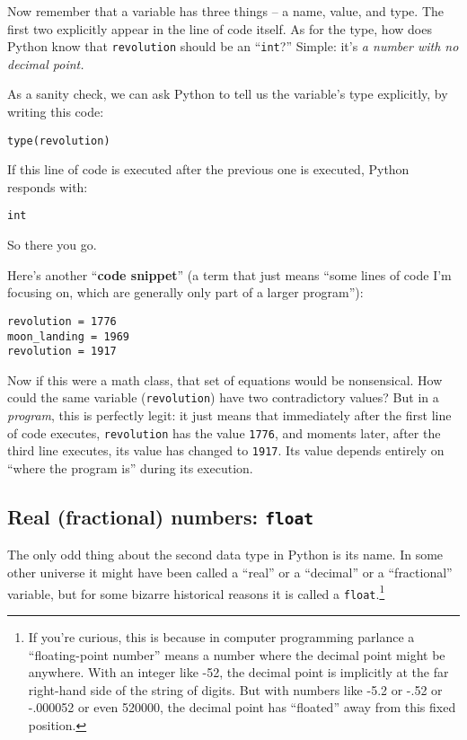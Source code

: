 Now remember that a variable has three things -- a name, value, and type. The
first two explicitly appear in the line of code itself. As for the type, how
does Python know that \texttt{revolution} should be an ``\texttt{int}?''
Simple: it's \textit{a number with no decimal point.}

As a sanity check, we can ask Python to tell us the variable's type explicitly,
by writing this code:

\begin{Verbatim}[fontsize=\small,samepage=true,frame=single,framesep=3mm]
type(revolution)
\end{Verbatim}

If this line of code is executed after the previous one is executed, Python
responds with:

\begin{Verbatim}[fontsize=\small,samepage=true,frame=leftline,framesep=5mm,framerule=1mm]
int
\end{Verbatim}

So there you go.

Here's another ``\textbf{code snippet}'' (a term that just means ``some lines
of code I'm focusing on, which are generally only part of a larger program''):

\begin{Verbatim}[fontsize=\small,samepage=true,frame=single,framesep=3mm]
revolution = 1776
moon_landing = 1969
revolution = 1917
\end{Verbatim}

Now if this were a math class, that set of equations would be nonsensical. How
could the same variable (\texttt{revolution}) have two contradictory values?
But in a \textit{program}, this is perfectly legit: it just means that
immediately after the first line of code executes, \texttt{revolution} has the
value \texttt{1776}, and moments later, after the third line executes, its
value has changed to \texttt{1917}. Its value depends entirely on ``where the
program is'' during its execution.

\subsection{Real (fractional) numbers: \texttt{float}}

The only odd thing about the second data type in Python is its name. In some
other universe it might have been called a ``real'' or a ``decimal'' or a
``fractional'' variable, but for some bizarre historical reasons it is called a
\texttt{float}.\footnote{If you're curious, this is because in computer
programming parlance a ``floating-point number'' means a number where the
decimal point might be anywhere. With an integer like -52, the decimal point is
implicitly at the far right-hand side of the string of digits. But with numbers
like -5.2 or -.52 or -.000052 or even 520000, the decimal point has ``floated''
away from this fixed position.}

